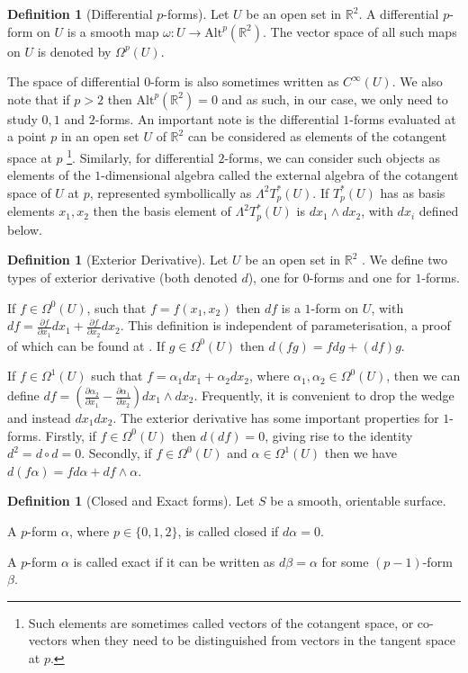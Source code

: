 \documentclass[11pt]{report}
\theoremstyle{definition}
\newtheorem{defn}[thm]{Definition}
\begin{document}
\begin{defn}[Differential $p$-forms]\label{p-form}
  Let $U$ be an open set in $\mathbb{R}^2$. A differential $p$-form on $U$ is a smooth map $\omega : U \rightarrow \text{Alt}^p(\mathbb{R}^2)$. The vector space of all such maps on $U$ is denoted by $\Omega^p(U)$.
\end{defn}
  The space of differential $0$-form is also sometimes written as $C^{\infty}(U)$. We also note that if $p > 2$ then $\text{Alt}^p(\mathbb{R}^2)=0$ and as such, in our case, we only need to study $0,1$ and $2$-forms. An important note is the differential $1$-forms evaluated at a point $p$ in an open set $U$ of $\mathbb{R}^2$ can be considered as elements of the cotangent space at $p$ \footnote{Such elements are sometimes called vectors of the cotangent space, or co-vectors when they need to be distinguished from vectors in the tangent space at $p$.}. Similarly, for differential $2$-forms, we can consider such objects as elements of the $1$-dimensional algebra called the external algebra of the cotangent space of $U$ at $p$, represented symbollically as $\Lambda^2T^*_p(U)$. If $T^*_p(U)$ has as basis elements $x_1, x_2$ then the basis element of $\Lambda^2T^*_p(U)$ is $dx_1\wedge dx_2$, with $dx_i$ defined below. 
\begin{defn}[Exterior Derivative]\label{exteriorD}
  Let $U$ be an open set in $\mathbb{R}^2$ . We define two types of exterior derivative (both denoted $d$), one for $0$-forms and one for $1$-forms.
  
  If $f \in \Omega^0(U)$, such that $f=f(x_1,x_2)$ then $df$ is a $1$-form on $U$, with $df = \frac{\partial f}{\partial x_1}dx_1 +  \frac{\partial f}{\partial x_2}dx_2$. This definition is independent of parameterisation, a proof of which can be found at \cite[p.50]{donaldson}. If $g \in \Omega^0(U)$ then $d(fg) = fdg + (df)g$.

  If $f \in \Omega^1(U)$ such that $f=\alpha_1 dx_1 + \alpha_2 dx_2$, where $\alpha_1, \alpha_2 \in \Omega^0(U)$, then we can define $df = \left(\frac{\partial \alpha_2}{\partial x_1} - \frac{\partial \alpha_1}{\partial x_2}\right) dx_1\wedge dx_2$. Frequently, it is convenient to drop the wedge and instead $dx_1dx_2$. The exterior derivative has some important properties for $1$-forms. Firstly, if $f \in \Omega^0(U)$ then $d(df) = 0$, giving rise to the identity $d^2 = d\circ d = 0$. Secondly, if $f \in \Omega^0(U)$ and $\alpha \in \Omega^1(U)$ then we have $d(f\alpha) = fd\alpha + df \wedge \alpha$.
\end{defn}
\begin{defn}[Closed and Exact forms]
  Let $S$ be a smooth, orientable surface. 

  A $p$-form $\alpha$, where $p \in \{0,1,2\}$, is called closed if $d\alpha = 0$. 

  A $p$-form $\alpha$ is called exact if it can be written as $d\beta = \alpha$ for some $(p-1)$-form $\beta$.
\end{defn}
\end{document}

